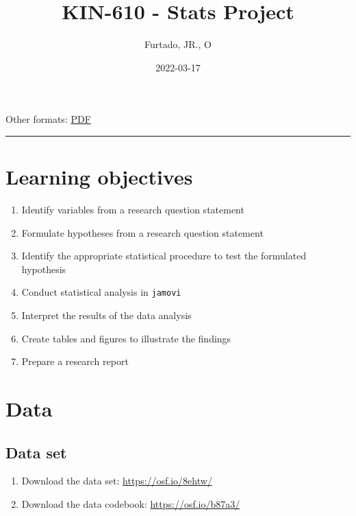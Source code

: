 \documentclass[
]{article}
\title{KIN-610 - Stats Project}
\author{Furtado, JR., O}
\date{2022-03-17}
\providecommand{\tightlist}{%
  \setlength{\itemsep}{0pt}\setlength{\parskip}{0pt}}
\begin{document}
\maketitle

{
\setcounter{tocdepth}{2}
\tableofcontents
}
Other formats: \href{project1.pdf}{PDF}

\begin{center}\rule{0.5\linewidth}{0.5pt}\end{center}

\hypertarget{learning-objectives}{%
\section{Learning objectives}\label{learning-objectives}}

\begin{enumerate}
\def\labelenumi{\arabic{enumi}.}
\tightlist
\item
  Identify variables from a research question statement
\item
  Formulate hypotheses from a research question statement
\item
  Identify the appropriate statistical procedure to test the formulated hypothesis
\item
  Conduct statistical analysis in \texttt{jamovi}
\item
  Interpret the results of the data analysis
\item
  Create tables and figures to illustrate the findings
\item
  Prepare a research report
\end{enumerate}

\hypertarget{data}{%
\section{Data}\label{data}}

\hypertarget{data-set}{%
\subsection{Data set}\label{data-set}}

\begin{enumerate}
\def\labelenumi{\arabic{enumi}.}
\tightlist
\item
  Download the data set: \url{https://osf.io/8ehtw/}
\item
  Download the data codebook: \url{https://osf.io/b87a3/}
\end{enumerate}
\end{document}
